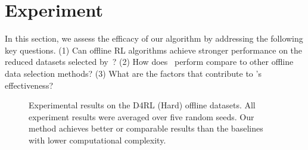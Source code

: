 \section{Experiment}\label{sec: exp}
In this section, we assess the efficacy of our algorithm by addressing the following key questions. 
(1) Can offline RL algorithms achieve stronger performance on the reduced datasets selected by~\name?
(2) How does \name~perform compare to other offline data selection methods? 
(3) What are the factors that contribute to \name's effectiveness?

\begin{figure}[t]
    \centering
    \hspace{0.2cm}
    \hspace{0.2cm}
    \hspace{0.2cm}
    \hspace{0.2cm}
    \hspace{0.2cm}
    \hspace{0.2cm}
    \caption{Experimental results on the D4RL (Hard) offline datasets. All experiment results were averaged over five random seeds. Our method achieves better or
    comparable results than the baselines with lower computational complexity.}
    \label{fig: d4rl hard}
    \vspace{-0.5cm}
\end{figure}


